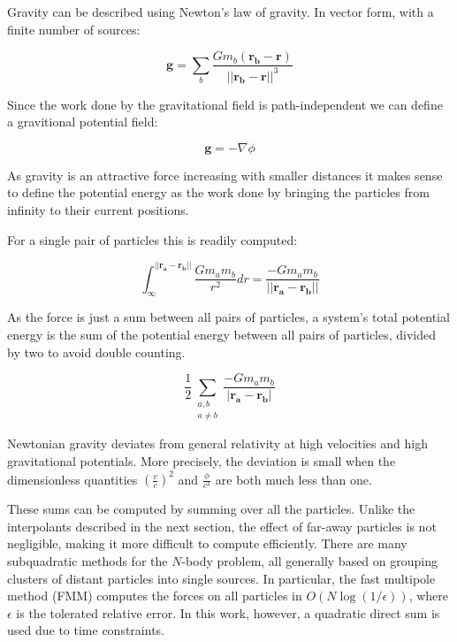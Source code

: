 \documentclass[../main.tex]{subfiles}
\begin{document}
Gravity can be described using Newton's law of gravity. In vector form, with a finite number of
sources:

\begin{equation}
    \bm{g} = \sum_b \frac{G m_b (\bm{r_b} - \bm{r})}{||\bm{r_b} - \bm{r}||^3}
\end{equation}

Since the work done by the gravitational field is path-independent we can define a gravitional
potential field:

\begin{equation}
    \bm{g} = - \nabla \phi
\end{equation}

As gravity is an attractive force increasing with smaller distances it makes
sense to define the potential energy as the work done by bringing the particles from infinity to
their current positions.

For a single pair of particles this is readily computed:

\begin{equation}
    \int_{\infty}^{||\bm{r_a} - \bm{r_b}||} \frac{G m_a m_b}{r^2} dr = \frac{-G m_a m_b}{||\bm{r_a} -
    \bm{r_b}||}
\end{equation}

As the force is just a sum between all pairs of particles, a system's total potential energy is the sum of the
potential energy between all pairs of particles, divided by two to avoid double counting.

\begin{equation}
    \frac{1}{2} \sum_{\substack{a, b \\ a \ne b}} \frac{-G m_a m_b}{|\bm{r_a} - \bm{r_b}|}
\end{equation}

Newtonian gravity deviates from general relativity at high velocities and high gravitational
potentials. More precisely, the deviation is small when the dimensionless quantities $(\frac{v}{c})^2$
and $\frac{\phi}{c^2}$ are both much less than one. \autocite{wikipedia_newtons_law}

These sums can be computed by summing over all the particles. Unlike the interpolants described in
the next section, the effect of far-away particles is not negligible, making it more difficult to
compute efficiently. There are many subquadratic methods for the $N$-body problem, all generally
based on grouping clusters of distant particles into single sources. In particular, the fast
multipole method (FMM) computes the forces on all particles in $O(N \log (1 / \epsilon) )$, where
$\epsilon$ is the tolerated relative error. \autocite{shortcourse_fmm} In this work, however, a
quadratic direct sum is used due to time constraints.
\end{document}

